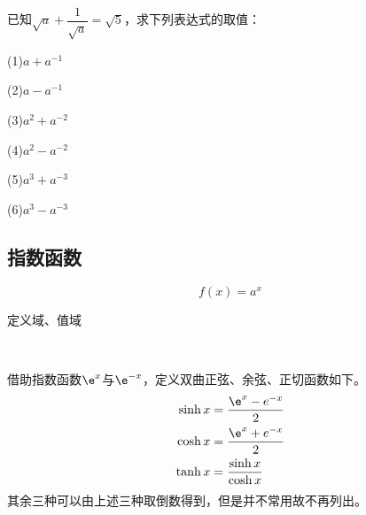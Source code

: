 \begin{example}
    已知\(\sqrt{a}+\dfrac{1}{\sqrt{a}}=\sqrt{5}\)，求下列表达式的取值：
    
    
    \begin{minipage}{0.45\textwidth}
        (1)\(a+a^{-1}\)

    (2)\(a-a^{-1}\)
    
    (3)\(a^2+a^{-2}\)
    \end{minipage}
    \hfill
    \begin{minipage}{0.45\textwidth}
        (4)\(a^2-a^{-2}\)

    (5)\(a^3+a^{-3}\)

    (6)\(a^3-a^{-3}\)
    \end{minipage}
    

    
\end{example}





\clearpage


\subsection{指数函数}
\begin{definition}[指数函数]
    \begin{equation}
        f(x)=a^x
    \end{equation}
\end{definition}
定义域、值域
\begin{theorem}[指数函数的单调性]
    
\end{theorem}
\begin{definition}[双曲三角函数]
    \ 

    借助指数函数$\e ^x$与$\e ^{-x}$，定义双曲正弦、余弦、正切函数如下。
\begin{align}
\sinh x&=\frac{\e^x-e^{-x}}{2}\\
\cosh x&=\frac{\e^x+e^{-x}}{2}\\
\tanh x&=\frac{\sinh x}{\cosh x}
\end{align}
其余三种可以由上述三种取倒数得到，但是并不常用故不再列出。
\end{definition}



